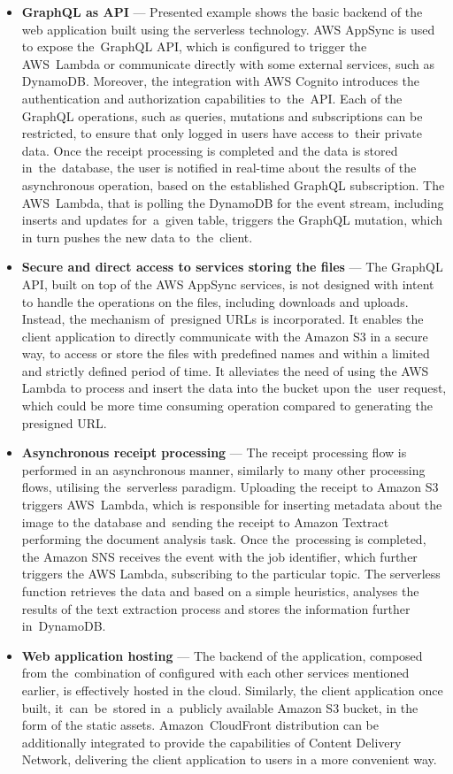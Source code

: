 \begin{itemize}
    \item \textbf{GraphQL as API} --- Presented example shows the basic backend of the web application built using the serverless technology. AWS AppSync is used to expose the~GraphQL API, which is configured to trigger the AWS~Lambda or communicate directly with some external services, such as DynamoDB. Moreover, the integration with AWS Cognito introduces the authentication and authorization capabilities to~the~API. Each of the GraphQL operations, such as queries, mutations and subscriptions can be restricted, to ensure that only logged in users have access to~their private data. Once the receipt processing is completed and the data is stored in~the~database, the user is notified in real-time about the results of the asynchronous operation, based on the established GraphQL subscription. The AWS~Lambda, that is polling the DynamoDB for the event stream, including inserts and updates for~a~given table, triggers the GraphQL mutation, which in turn pushes the new data to~the~client.
    \item \textbf{Secure and direct access to services storing the files} --- The GraphQL API, built on top of the AWS AppSync services, is not designed with intent to handle the operations on the files, including downloads and uploads. Instead, the mechanism of~presigned URLs is incorporated. It enables the client application to directly communicate with the Amazon S3 in a secure way, to access or store the files with predefined names and within a limited and strictly defined period of time. It alleviates the need of using the AWS Lambda to process and insert the data into the bucket upon the~user request, which could be more time consuming operation compared to generating the presigned URL.
    \item \textbf{Asynchronous receipt processing} --- The receipt processing flow is performed in an asynchronous manner, similarly to many other processing flows, utilising the~serverless paradigm. Uploading the receipt to Amazon S3 triggers AWS~Lambda, which is responsible for inserting metadata about the image to the database and~sending the receipt to Amazon Textract performing the document analysis task. Once the~processing is completed, the Amazon SNS receives the event with the job identifier, which further triggers the AWS Lambda, subscribing to the particular topic. The serverless function retrieves the data and based on a simple heuristics, analyses the results of the text extraction process and stores the information further in~DynamoDB.
    \item \textbf{Web application hosting} --- The backend of the application, composed from the~combination of configured with each other services mentioned earlier, is effectively hosted in the cloud. Similarly, the client application once built, it~can~be~stored in~a~publicly available Amazon S3 bucket, in the form of the static assets. Amazon~CloudFront distribution can be additionally integrated to provide the capabilities of Content Delivery Network, delivering the client application to users in a more convenient way.
\end{itemize}

